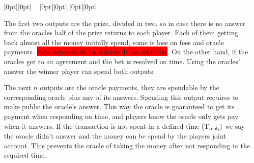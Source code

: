 \raisebox{17em}[0pt][0pt]{
        \hbox{\hspace{34em} }
}
\raisebox{12em}[0pt][0pt]{
    \hbox{}
}
\raisebox{8em}[0pt][0pt]{
        \hbox{\hspace{35em} }
}

The first two outputs are the prize, divided in two, so in case there is no
  answer from the oracles half of the prize returns to each player.
Each of them getting back almost all the money initially spend, some is lose
  on fees and oracle payments. \colorbox{red}{Esto depende de los valores de
  las variables}. On the other hand, if the oracles get to an agreement and the
  bet is resolved on time. Using the oracles' answer the winner player can spend
  both outputs.

The next $n$ outputs are the oracle payments, they are spendable by the
  corresponding oracle plus any of its answers.
Spending this output requires to make public the oracle's answer. This way the
  oracle is guaranteed to get its payment when responding on time, and players
  know the oracle only gets pay when it answers.
  If the transaction is not spent in a defined time (T$_{\text{reply}}$) we say
  the oracle didn't answer and the money can be spend by the players joint
  account.
This prevents the oracle of taking the money after not responding in the
  required time.

